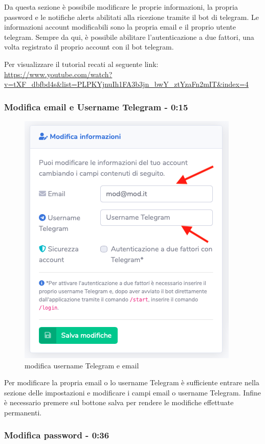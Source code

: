	Da questa sezione è possibile modificare le proprie informazioni, la propria password e le notifiche alerts abilitati alla ricezione tramite il bot di telegram.
	Le informazioni account modificabili sono la propria email e il proprio utente telegram. Sempre da qui, è possibile abilitare l’autenticazione a due fattori, una volta registrato il proprio account con il bot telegram.

	Per visualizzare il tutorial recati al seguente link:
	\url{https://www.youtube.com/watch?v=tXF_dbfbd4s&list=PLPKYjnuIh1FA3b3jn_bwY_ztYzaFn2mIT&index=4}

	\subsubsection{Modifica email e Username Telegram - 0:15}

		\begin{figure}[H]
		\centering
		\includegraphics[scale=0.600]{res/images/membro/modUsername.png}
		\caption{modifica username Telegram e email}
	\end{figure}

		Per modificare la propria email o lo username Telegram è sufficiente entrare nella sezione delle impostazioni e modificare i campi email o username Telegram.
		Infine è necessario premere sul bottone salva per rendere le modifiche effettuate permanenti.

	\subsubsection{Modifica password - 0:36}

